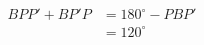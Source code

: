 \documentclass[preview]{standalone}
\begin{document}
\begin{align*}
B PP' + B P'P &= 180^{\circ} - P B P'  \\ &= 120^{\circ}
\end{align*}
\end{document}
